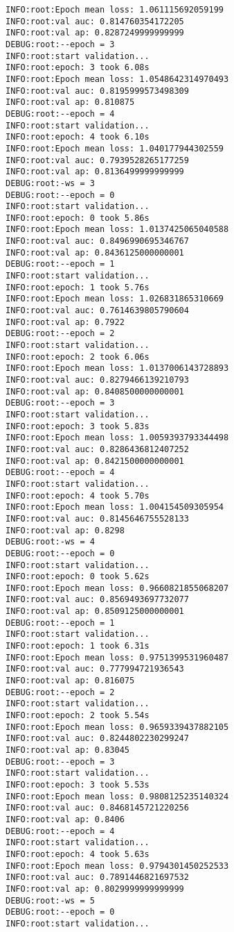 \documentclass[11pt]{article}
\begin{document}
\begin{verbatim}
INFO:root:Epoch mean loss: 1.061115692059199
INFO:root:val auc: 0.814760354172205
INFO:root:val ap: 0.8287249999999999
DEBUG:root:--epoch = 3
INFO:root:start validation...
INFO:root:epoch: 3 took 6.08s
INFO:root:Epoch mean loss: 1.0548642314970493
INFO:root:val auc: 0.8195999573498309
INFO:root:val ap: 0.810875
DEBUG:root:--epoch = 4
INFO:root:start validation...
INFO:root:epoch: 4 took 6.10s
INFO:root:Epoch mean loss: 1.040177944302559
INFO:root:val auc: 0.7939528265177259
INFO:root:val ap: 0.8136499999999999
DEBUG:root:-ws = 3
DEBUG:root:--epoch = 0
INFO:root:start validation...
INFO:root:epoch: 0 took 5.86s
INFO:root:Epoch mean loss: 1.0137425065040588
INFO:root:val auc: 0.8496990695346767
INFO:root:val ap: 0.8436125000000001
DEBUG:root:--epoch = 1
INFO:root:start validation...
INFO:root:epoch: 1 took 5.76s
INFO:root:Epoch mean loss: 1.026831865310669
INFO:root:val auc: 0.7614639805790604
INFO:root:val ap: 0.7922
DEBUG:root:--epoch = 2
INFO:root:start validation...
INFO:root:epoch: 2 took 6.06s
INFO:root:Epoch mean loss: 1.0137006143728893
INFO:root:val auc: 0.8279466139210793
INFO:root:val ap: 0.8408500000000001
DEBUG:root:--epoch = 3
INFO:root:start validation...
INFO:root:epoch: 3 took 5.83s
INFO:root:Epoch mean loss: 1.0059393793344498
INFO:root:val auc: 0.8286436812407252
INFO:root:val ap: 0.8421500000000001
DEBUG:root:--epoch = 4
INFO:root:start validation...
INFO:root:epoch: 4 took 5.70s
INFO:root:Epoch mean loss: 1.004154509305954
INFO:root:val auc: 0.8145646755528133
INFO:root:val ap: 0.8298
DEBUG:root:-ws = 4
DEBUG:root:--epoch = 0
INFO:root:start validation...
INFO:root:epoch: 0 took 5.62s
INFO:root:Epoch mean loss: 0.9660821855068207
INFO:root:val auc: 0.8569493697732077
INFO:root:val ap: 0.8509125000000001
DEBUG:root:--epoch = 1
INFO:root:start validation...
INFO:root:epoch: 1 took 6.31s
INFO:root:Epoch mean loss: 0.9751399531960487
INFO:root:val auc: 0.777994721936543
INFO:root:val ap: 0.816075
DEBUG:root:--epoch = 2
INFO:root:start validation...
INFO:root:epoch: 2 took 5.54s
INFO:root:Epoch mean loss: 0.9659339437882105
INFO:root:val auc: 0.8244802230299247
INFO:root:val ap: 0.83045
DEBUG:root:--epoch = 3
INFO:root:start validation...
INFO:root:epoch: 3 took 5.53s
INFO:root:Epoch mean loss: 0.9808125235140324
INFO:root:val auc: 0.8468145721220256
INFO:root:val ap: 0.8406
DEBUG:root:--epoch = 4
INFO:root:start validation...
INFO:root:epoch: 4 took 5.63s
INFO:root:Epoch mean loss: 0.9794301450252533
INFO:root:val auc: 0.7891446821697532
INFO:root:val ap: 0.8029999999999999
DEBUG:root:-ws = 5
DEBUG:root:--epoch = 0
INFO:root:start validation...

\end{verbatim}
\end{document}

